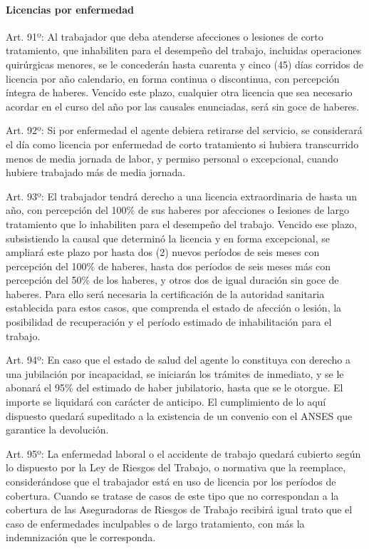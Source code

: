\documentclass[]{article}
\let\oldparagraph\paragraph
\renewcommand{\paragraph}[1]{\oldparagraph{#1}\mbox{}}
\begin{document}
\paragraph{Licencias por enfermedad}\label{licencias-por-enfermedad}

Art. 91º: Al trabajador que deba atenderse afecciones o lesiones de
corto tratamiento, que inhabiliten para el desempeño del trabajo,
incluidas operaciones quirúrgicas menores, se le concederán hasta
cuarenta y cinco (45) días corridos de licencia por año calendario, en
forma continua o discontinua, con percepción íntegra de haberes. Vencido
este plazo, cualquier otra licencia que sea necesario acordar en el
curso del año por las causales enunciadas, será sin goce de haberes.

Art. 92º: Si por enfermedad el agente debiera retirarse del servicio, se
considerará el día como licencia por enfermedad de corto tratamiento si
hubiera transcurrido menos de media jornada de labor, y permiso personal
o excepcional, cuando hubiere trabajado más de media jornada.

Art. 93º: El trabajador tendrá derecho a una licencia extraordinaria de
hasta un año, con percepción del 100\% de sus haberes por afecciones o
Iesiones de largo tratamiento que lo inhabiliten para el desempeño del
trabajo. Vencido ese plazo, subsistiendo la causal que determinó la
licencia y en forma excepcional, se ampliará este plazo por hasta dos
(2) nuevos períodos de seis meses con percepción del 100\% de haberes,
hasta dos períodos de seis meses más con percepción del 50\% de los
haberes, y otros dos de igual duración sin goce de haberes. Para ello
será necesaria la certificación de la autoridad sanitaria establecida
para estos casos, que comprenda el estado de afección o lesión, la
posibilidad de recuperación y el período estimado de inhabilitación para
el trabajo.

Art. 94º: En caso que el estado de salud del agente lo constituya con
derecho a una jubilación por incapacidad, se iniciarán los trámites de
inmediato, y se le abonará el 95\% del estimado de haber jubilatorio,
hasta que se le otorgue. El importe se liquidará con carácter de
anticipo. El cumplimiento de lo aquí dispuesto quedará supeditado a la
existencia de un convenio con el ANSES que garantice la devolución.

Art. 95º: La enfermedad laboral o el accidente de trabajo quedará
cubierto según lo dispuesto por la Ley de Riesgos del Trabajo, o
normativa que la reemplace, considerándose que el trabajador está en uso
de licencia por los períodos de cobertura. Cuando se tratase de casos de
este tipo que no correspondan a la cobertura de las Aseguradoras de
Riesgos de Trabajo recibirá igual trato que el caso de enfermedades
inculpables o de largo tratamiento, con más la indemnización que le
corresponda.
\end{document}

